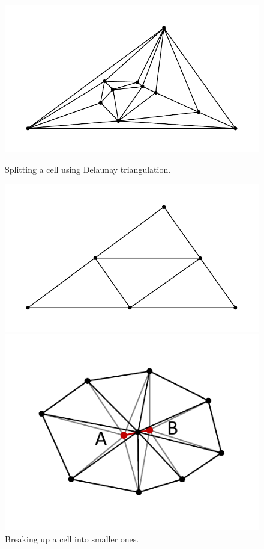 \documentclass[
11pt,%
tightenlines,%
twoside,%
onecolumn,%
nofloats,%
nobibnotes,%
nofootinbib,%
superscriptaddress,%
noshowpacs,%
centertags]%
{revtex4}
\begin{document}
\begin{figure}[h]
  \centering
  \begin{minipage}[h]{0.35\textwidth}
    \includegraphics[width=\textwidth]{pics/pic_delaunay_size.pdf}
    \caption{Splitting a cell using Delaunay triangulation.}\label{fig:pic_delaunay}
  \end{minipage}
  \hfill
  \begin{minipage}[h]{0.35\textwidth}
    \includegraphics[width=\textwidth]{pics/pic_delaunay_2_size.pdf}
    \caption{Breaking up a cell into smaller ones.}\label{fig:pic_delaunay_2}
  \end{minipage}
  \hfill
  \begin{minipage}[h]{0.28\textwidth}
    \includegraphics[width=\textwidth]{pics/pic_reduce_edge_size.pdf}

\end{minipage}
\end{figure}
\end{document}
